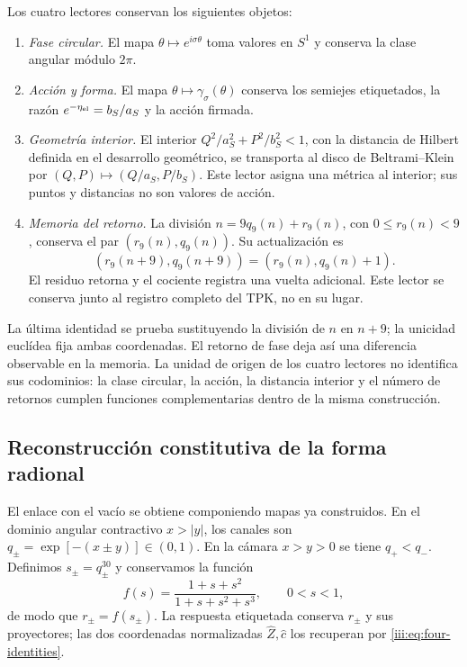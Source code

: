 Los cuatro lectores conservan los siguientes objetos:
\begin{enumerate}
 \item \emph{Fase circular.} El mapa
 $\theta\mapsto e^{i\sigma\theta}$ toma valores en $S^1$ y conserva
 la clase angular módulo $2\pi$.
 \item \emph{Acción y forma.} El mapa $\theta\mapsto
 \gamma_\sigma(\theta)$ conserva los semiejes etiquetados, la razón
 $e^{-\eta_{\rm el}}=b_S/a_S$ y la acción firmada.
 \item \emph{Geometría interior.} El interior
 $Q^2/a_S^2+P^2/b_S^2<1$, con la distancia de Hilbert definida en el
 desarrollo geométrico, se transporta al disco de Beltrami--Klein por
 $(Q,P)\mapsto(Q/a_S,P/b_S)$. Este lector asigna una métrica al
 interior; sus puntos y distancias no son valores de acción.
 \item \emph{Memoria del retorno.} La división
 $n=9q_9(n)+r_9(n)$, con $0\leq r_9(n)<9$, conserva el par
 $(r_9(n),q_9(n))$. Su actualización es
 \[
 (r_9(n+9),q_9(n+9))=(r_9(n),q_9(n)+1).
 \]
 El residuo retorna y el cociente registra una vuelta adicional. Este
 lector se conserva junto al registro completo del TPK, no en su lugar.
\end{enumerate}

La última identidad se prueba sustituyendo la división de $n$ en $n+9$;
la unicidad euclídea fija ambas coordenadas. El retorno de fase deja así
una diferencia observable en la memoria. La unidad de origen de los
cuatro lectores no identifica sus codominios: la clase circular, la
acción, la distancia interior y el número de retornos cumplen funciones
complementarias dentro de la misma construcción.

\subsection{Reconstrucción constitutiva de la forma radional}
\label{iii:subsec:radion-puente}

El enlace con el vacío se obtiene componiendo mapas ya construidos. En el
dominio angular contractivo $x>|y|$, los canales son
$q_\pm=\exp[-(x\pm y)]\in(0,1)$. En la cámara $x>y>0$ se tiene
$q_+<q_-$. Definimos $s_\pm=q_\pm^{30}$ y conservamos la función
\[
 f(s)=\frac{1+s+s^2}{1+s+s^2+s^3},\qquad 0<s<1,
\]
de modo que $r_\pm=f(s_\pm)$. La respuesta etiquetada conserva
$r_\pm$ y sus proyectores; las dos coordenadas normalizadas
$\widehat Z,\widehat c$ los recuperan por \eqref{iii:eq:four-identities}.

